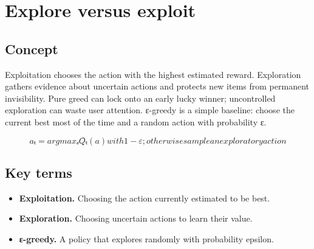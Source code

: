 \section{Explore versus exploit}

\begin{abstract}
Use the current winner, or spend an impression learning whether another option is better.
\end{abstract}

\subsection{Concept}
Exploitation chooses the action with the highest estimated reward. Exploration gathers evidence about uncertain actions and protects new items from permanent invisibility. Pure greed can lock onto an early lucky winner; uncontrolled exploration can waste user attention. ε-greedy is a simple baseline: choose the current best most of the time and a random action with probability ε.

\begin{equation*}
aₜ = argmaxₐ Q̂ₜ(a) with 1-ε; otherwise sample an exploratory action
\end{equation*}

\subsection{Key terms}
\begin{itemize}
\item \textbf{Exploitation.} Choosing the action currently estimated to be best.
\item \textbf{Exploration.} Choosing uncertain actions to learn their value.
\item \textbf{ε-greedy.} A policy that explores randomly with probability epsilon.
\end{itemize}
